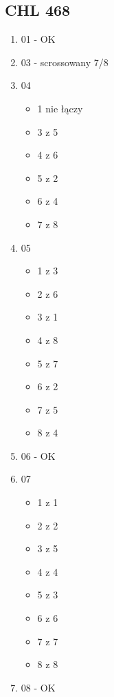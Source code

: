 \documentclass{article}
\begin{document}
\subsection{CHL 468}
\begin{minipage}{0.4\textwidth}
  \begin{enumerate}
  \item 01 - OK
  \item 03 - scrossowany 7/8
  \item 04
    \begin{itemize}
    \item 1 nie łączy
    \item 3 z 5
    \item 4 z 6
    \item 5 z 2
    \item 6 z 4
    \item 7 z 8
    \end{itemize}
  \item 05
    \begin{itemize}
    \item 1 z 3
    \item 2 z 6
    \item 3 z 1
  \item 4 z 8
  \item 5 z 7
  \item 6 z 2
  \item 7 z 5
  \item 8 z 4
  \end{itemize}
\item 06 - OK
\item 07
  \begin{itemize}
  \item 1 z 1
  \item 2 z 2
  \item 3 z 5
  \item 4 z 4
  \item 5 z 3
  \item 6 z 6
  \item 7 z 7
  \item 8 z 8
  \end{itemize}
\item 08 - OK
\end{enumerate}
\end{minipage}
\end{document}
